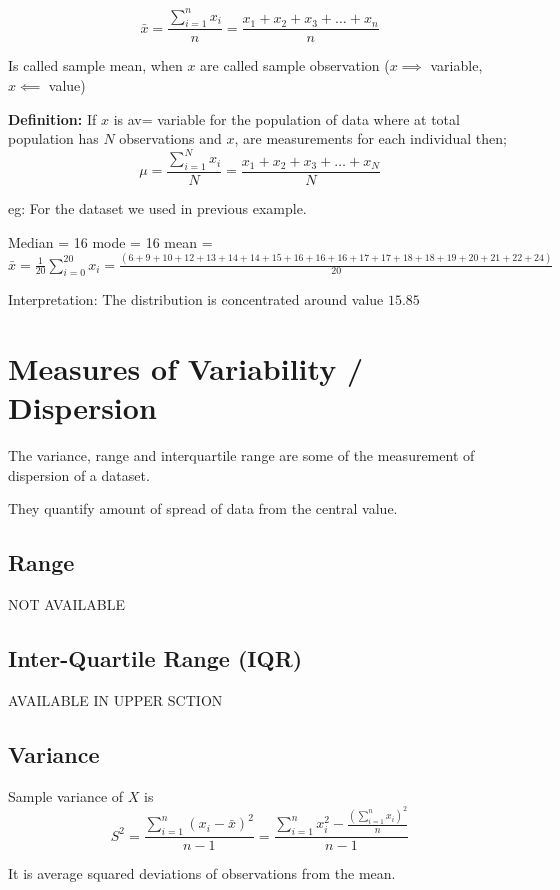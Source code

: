 \documentclass[12pt]{article}
\begin{document}
\begin{equation}
    \bar{x} = \frac{\sum_{i = 1}^{n} x_i}{n}= \frac{x_1 + x_2 + x_3 + \ldots + x_n}{n}
\end{equation}

Is called sample mean, when $x$ are called sample observation ($x \implies$ variable, $x \impliedby$ value)

\textbf{Definition: }If $x$ is av= variable for the population of data where at total population has $N$ observations and $x$, are measurements for each individual then;
\begin{equation}
    \mu = \frac{\sum_{i = 1}^{N} x_i}{N}= \frac{x_1 + x_2 + x_3 + \ldots + x_N}{N}
\end{equation}

eg: For the dataset we used in previous example.

Median = 16
mode  = 16
mean = $\bar{x} = \frac{1}{20}\sum_{i = 0}^{20} x_i = \frac{(6 + 9 + 10 + 12 +13 + 14 + 14 +15 + 16 +16 + 16 + 17 + 17 + 18 + 18 + 19 + 20 + 21 + 22 + 24)}{20}$

Interpretation: The distribution is concentrated around value $15.85$

\section{Measures of Variability / Dispersion}
The variance, range and interquartile range are some of the measurement of dispersion of a dataset.

They quantify amount of spread of data from the central value.
\subsection{Range}
NOT AVAILABLE
\subsection{Inter-Quartile Range (IQR)}
AVAILABLE IN UPPER SCTION
\subsection{Variance}
Sample variance of $X$ is
\begin{equation}
    S^2 = \frac{\sum_{i = 1}^{n}(x_i - \bar{x})^2}{n - 1} = \frac{\sum_{i = 1}^{n} x_i^2 - \frac{(\sum_{i = 1}^{n}x_i)^2}{n}}{n-1}
\end{equation}

It is average squared deviations of observations from the mean.
\end{document}

